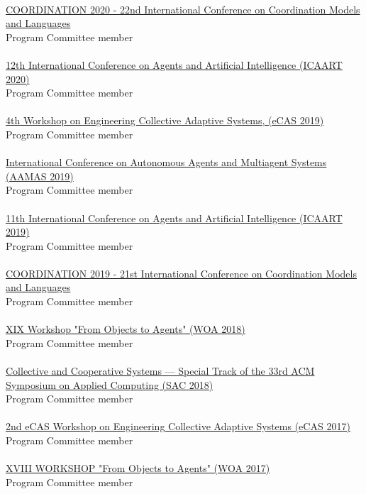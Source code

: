 \halfblankline \\
\href{http://www.discotec.org/2020/coordination}{COORDINATION 2020 - 22nd International Conference on Coordination Models and Languages}
\\ Program Committee member \\
\halfblankline \\
\href{http://www.icaart.org/?y=2020}{12th International Conference on Agents and Artificial Intelligence 
(ICAART 2020)}
\\ Program Committee member \\
\halfblankline \\
\href{http://apice.unibo.it/xwiki/bin/view/ECAS2019/Committees}{4th Workshop on Engineering Collective Adaptive Systems, (eCAS 2019)}
\\ Program Committee member \\
\halfblankline \\
\href{http://aamas2019.encs.concordia.ca/}{International Conference on Autonomous Agents and 
Multiagent Systems (AAMAS 2019)}
\\ Program Committee member \\
\halfblankline \\
\href{http://www.icaart.org/?y=2019}{11th International Conference on Agents and Artificial Intelligence 
(ICAART 2019)}
\\ Program Committee member \\
\halfblankline \\
\href{http://www.discotec.org/2019/coordination}{COORDINATION 2019 - 21st International Conference on Coordination Models and Languages}
\\ Program Committee member \\
\halfblankline \\
\href{http://diid.unipa.it/roboticslab/woa2018/}{XIX Workshop "From Objects to Agents" (WOA 2018)}
\\ Program Committee member \\
\halfblankline \\
\href{http://sac-cas2018.apice.unibo.it/referees.html}{Collective and Cooperative Systems --- Special Track of the 33rd ACM Symposium on Applied Computing (SAC 2018)}
\\ Program Committee member \\
\halfblankline \\
\href{http://apice.unibo.it/xwiki/bin/view/ECAS2017/WebHome}{2nd eCAS Workshop on Engineering Collective Adaptive Systems (eCAS 2017)}
\\ Program Committee member \\
\halfblankline \\
\href{http://woa2017.unirc.it/}{XVIII WORKSHOP "From Objects to Agents" (WOA 2017)}
\\ Program Committee member \\
